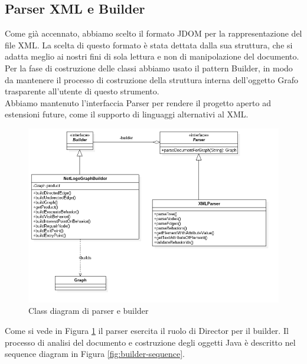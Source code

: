 \subsection{Parser XML e Builder}
Come già accennato, abbiamo scelto il formato JDOM per la rappresentazione del file XML. La scelta di questo formato è stata dettata dalla sua struttura, che si adatta meglio ai nostri fini di sola lettura e non di manipolazione del documento.\\
Per la fase di costruzione delle classi abbiamo usato il pattern Builder, in modo da mantenere il processo di costruzione della struttura interna dell'oggetto Grafo trasparente all'utente di questo strumento.\\
Abbiamo mantenuto l'interfaccia Parser per rendere il progetto aperto ad estensioni future, come il supporto di linguaggi alternativi al XML.\\
\begin{figure}[htbp]
\centering
\includegraphics[width=\textwidth,height=\textheight,keepaspectratio]{images/builder-diagram.png}
\caption{Class diagram di parser e builder}
\label{fig:builder-diagram}
\end{figure}
Come si vede in Figura \ref{fig:builder-diagram} il parser esercita il ruolo di Director per il builder. Il processo di analisi del documento e costruzione degli oggetti Java è descritto nel sequence diagram in Figura \ref{fig:builder-sequence}.
